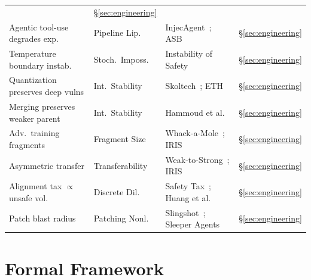 \documentclass[11pt]{article}
\begin{document}
\begin{table}[t]
\begin{tabular}{@{}p{3.4cm}p{2.0cm}p{2.4cm}p{2.4cm}p{2.2cm}@{}}
  & \S\ref{sec:engineering} \\[2pt]
Agentic tool-use degrades exp.
  & Pipeline Lip.
  & \multicolumn{2}{p{4.8cm}}{InjecAgent~\cite{zhan2024injecagent}; ASB~\cite{zhang2024asb}}
  & \S\ref{sec:engineering} \\[2pt]
Temperature boundary instab.
  & Stoch.\ Imposs.
  & \multicolumn{2}{p{4.8cm}}{Instability of Safety~\cite{yuan2025instability}}
  & \S\ref{sec:engineering} \\[2pt]
Quantization preserves deep vulns
  & Int.\ Stability
  & \multicolumn{2}{p{4.8cm}}{Skoltech~\cite{skoltech2025quant}; ETH~\cite{eth2025gguf}}
  & \S\ref{sec:engineering} \\[2pt]
Merging preserves weaker parent
  & Int.\ Stability
  & \multicolumn{2}{p{4.8cm}}{Hammoud et al.~\cite{hammoud2024merging}}
  & \S\ref{sec:engineering} \\[2pt]
Adv.\ training fragments
  & Fragment Size
  & \multicolumn{2}{p{4.8cm}}{Whack-a-Mole~\cite{liu2026whackamole}; IRIS~\cite{iris2025}}
  & \S\ref{sec:engineering} \\[2pt]
Asymmetric transfer
  & Transferability
  & \multicolumn{2}{p{4.8cm}}{Weak-to-Strong~\cite{zhao2025weak}; IRIS~\cite{iris2025}}
  & \S\ref{sec:engineering} \\[2pt]
Alignment tax $\propto$ unsafe vol.
  & Discrete Dil.
  & \multicolumn{2}{p{4.8cm}}{Safety Tax~\cite{huang2025safetytax}; Huang et al.~\cite{huang2026formal}}
  & \S\ref{sec:engineering} \\[2pt]
Patch blast radius
  & Patching Nonl.
  & \multicolumn{2}{p{4.8cm}}{Slingshot~\cite{slingshot2026}; Sleeper Agents~\cite{hubinger2024sleeper}}
  & \S\ref{sec:engineering} \\
\bottomrule
\end{tabular}
\end{table}


\section{Formal Framework}
\label{sec:setup}
\end{document}
